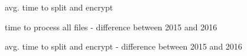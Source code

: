 \begin{figure}[h]
\centering

\caption{avg. time to split and encrypt}
\end{figure}

\begin{figure}[h]
\centering

\caption{time to process all files - difference between 2015 and 2016}
\end{figure}

\begin{figure}[h]
\centering

\caption{avg. time to split and encrypt - difference between 2015 and 2016}
\end{figure}